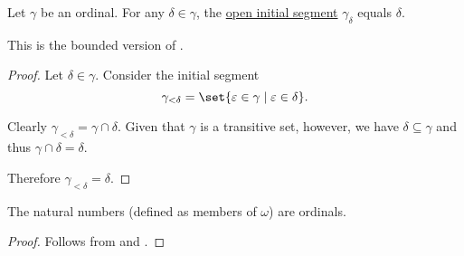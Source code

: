 \begin{proposition}\label{thm:initial_segment_of_ordinal}
  Let \( \gamma \) be an ordinal. For any \( \delta \in \gamma \), the \hyperref[def:poset_interval/ray]{open initial segment} \( \gamma_\delta \) equals \( \delta \).

  This is the bounded version of .
\end{proposition}
\begin{proof}
  Let \( \delta \in \gamma \). Consider the initial segment
  \begin{equation*}
    \gamma_{<\delta} = \set{ \varepsilon \in \gamma \given \varepsilon \in \delta }.
  \end{equation*}

  Clearly \( \gamma_{<\delta} = \gamma \cap \delta \). Given that \( \gamma \) is a transitive set, however, we have \( \delta \subseteq \gamma \) and thus \( \gamma \cap \delta = \delta \).

  Therefore \( \gamma_{<\delta} = \delta \).
\end{proof}

\begin{corollary}\label{thm:natural_numbers_are_ordinals}
  The natural numbers (defined as members of \hyperref[thm:smallest_inductive_set_existence]{\( \omega \)}) are ordinals.
\end{corollary}
\begin{proof}
  Follows from  and .
\end{proof}

